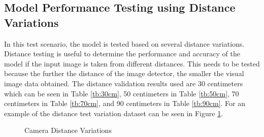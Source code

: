 \subsection{Model Performance Testing using Distance Variations}

In this test scenario, the model is tested based on several distance variations. Distance testing is useful to determine the performance and accuracy of the model if the input image is taken from different distances. This needs to be tested because the further the distance of the image detector, the smaller the visual image data obtained. The distance validation results used are 30 centimeters which can be seen in Table \ref{tb:30cm}, 50 centimeters in Table \ref{tb:50cm}, 70 centimeters in Table \ref{tb:70cm}, and 90 centimeters in Table \ref{tb:90cm}. For an example of the distance test variation dataset can be seen in Figure \ref{fig:Variasi Jarak Kamera}.

\begin{figure}[H]
  \centering
    \hfil 

    \hfil

  \caption{Camera Distance Variations}
  \label{fig:Variasi Jarak Kamera}
\end{figure}

